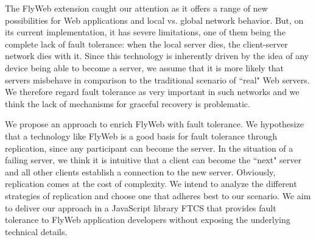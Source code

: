 The FlyWeb extension caught our attention as it offers a range of new possibilities for Web applications and local vs. global network behavior. But, on its current implementation, it has severe limitations, one of them being the complete lack of fault tolerance: when the local server dies, the client-server network dies with it. Since this technology is inherently driven by the idea of any device being able to become a server, we assume that it is more likely that servers misbehave in comparison to the traditional scenario of ``real" Web servers. We therefore regard fault tolerance as very important in such networks and we think the lack of mechanisms for graceful recovery is problematic.


We propose an approach to enrich FlyWeb with fault tolerance. We hypothesize that a technology like FlyWeb is a good basis for fault tolerance through replication, since any participant can become the server. In the situation of a failing server, we think it is intuitive that a client can become the ``next" server and all other clients establish a connection to the new server. Obviously, replication comes at the cost of complexity. We intend to analyze the different strategies of replication and choose one that adheres best to our scenario. We aim to deliver our approach in a JavaScript library FTCS that provides fault tolerance to FlyWeb application developers without exposing the underlying technical details.